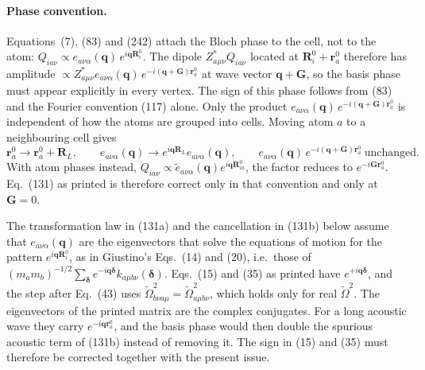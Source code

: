 \paragraph{Phase convention.}
Equations~(7), (83) and (242) attach the Bloch phase to the cell, not to the atom: $Q_{ia\nu}\propto e_{a\nu\alpha}(\mathbf q)\,e^{i\mathbf q\mathbf R^0_i}$. The dipole $Z^*_{a\mu\nu}Q_{ia\nu}$ located at $\mathbf R^0_i+\mathbf r^0_a$ therefore has amplitude $\propto Z^*_{a\mu\nu}e_{a\nu\alpha}(\mathbf q)\,e^{-i(\mathbf q+\mathbf G)\mathbf r^0_a}$ at wave vector $\mathbf q+\mathbf G$, so the basis phase must appear explicitly in every vertex. The sign of this phase follows from (83) and the Fourier convention (117) alone. Only the product $e_{a\nu\alpha}(\mathbf q)\,e^{-i(\mathbf q+\mathbf G)\mathbf r^0_a}$ is independent of how the atoms are grouped into cells. Moving atom $a$ to a neighbouring cell gives
\begin{equation}
\mathbf r^0_a\to\mathbf r^0_a+\mathbf R_L,\qquad
e_{a\nu\alpha}(\mathbf q)\to e^{i\mathbf q\mathbf R_L}e_{a\nu\alpha}(\mathbf q),\qquad
e_{a\nu\alpha}(\mathbf q)\,e^{-i(\mathbf q+\mathbf G)\mathbf r^0_a}\ \text{unchanged}.
\tag{131a}
\end{equation}
With atom phases instead, $Q_{ia\nu}\propto\tilde e_{a\nu\alpha}(\mathbf q)e^{i\mathbf q\mathbf R^0_{ia}}$, the factor reduces to $e^{-i\mathbf G\mathbf r^0_a}$. Eq.~(131) as printed is therefore correct only in that convention and only at $\mathbf G=0$.

The transformation law in (131a) and the cancellation in (131b) below assume that $e_{a\nu\alpha}(\mathbf q)$ are the eigenvectors that solve the equations of motion for the pattern $e^{i\mathbf q\mathbf R^0_i}$, as in Giustino's Eqs.~(14) and (20), i.e.\ those of $(m_am_b)^{-1/2}\sum_{\boldsymbol\delta}e^{-i\mathbf q\boldsymbol\delta}k_{a\mu b\nu}(\boldsymbol\delta)$. Eqs.~(15) and (35) as printed have $e^{+i\mathbf q\boldsymbol\delta}$, and the step after Eq.~(43) uses $\tilde\Omega^2_{b\nu a\mu}=\tilde\Omega^2_{a\mu b\nu}$, which holds only for real $\tilde\Omega^2$. The eigenvectors of the printed matrix are the complex conjugates. For a long acoustic wave they carry $e^{-i\mathbf q\mathbf r^0_a}$, and the basis phase would then double the spurious acoustic term of (131b) instead of removing it. The sign in (15) and (35) must therefore be corrected together with the present issue.

